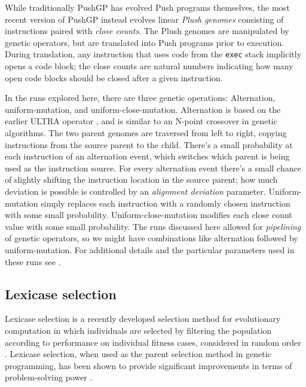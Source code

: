 While traditionally PushGP has evolved Push programs themselves, the most recent version of PushGP instead evolves linear
\emph{Plush genomes} consisting of 
instructions paired with \emph{close counts}.
The Plush genomes are manipulated by genetic operators, but are translated into Push programs prior to execution.
During translation, any instruction that uses code from the \texttt{exec} stack implicitly opens a code block; the close counts are natural numbers 
indicating how many open code blocks should be closed after a given instruction.

In the runs explored here, there are three genetic operations: Alternation, uniform-mutation, and 
uniform-close-mutation.
Alternation is based on the earlier ULTRA operator \citep{Spector:2013:GPTP:new}, 
and is similar to an N-point crossover in 
genetic algorithms. The two parent genomes
are traversed from left to right, copying instructions from the source parent to the child. There's
a small probability at each instruction of an alternation event, which switches which parent is being 
used as the instruction source. For every alternation event there's a small chance of slightly shifting 
the instruction location in the source parent; how much deviation is possible is controlled by an 
\emph{alignment deviation} parameter. 
Uniform-mutation simply replaces each instruction with a randomly chosen instruction with some
small probability. Uniform-close-mutation modifies each close count value with some small probability.
The runs discussed here allowed for \emph{pipelining} of genetic operators, so we might have
combinations like alternation followed by uniform-mutation.
For additional details and the particular parameters used in these runs see \citep{Helmuth:2015:GECCO}.

\subsection{Lexicase selection}


Lexicase selection is a recently developed selection method for evolutionary computation in which 
individuals are selected by filtering the population according to performance on individual 
fitness cases, considered in random order \citep{Spector:2012:GECCOcompA}. Lexicase 
selection, when used as the parent selection method in genetic programming, has been shown to provide 
significant improvements in terms of problem-solving power \citep{Helmuth:2015:ieeeTEC, Helmuth:2015:GECCO}. 

